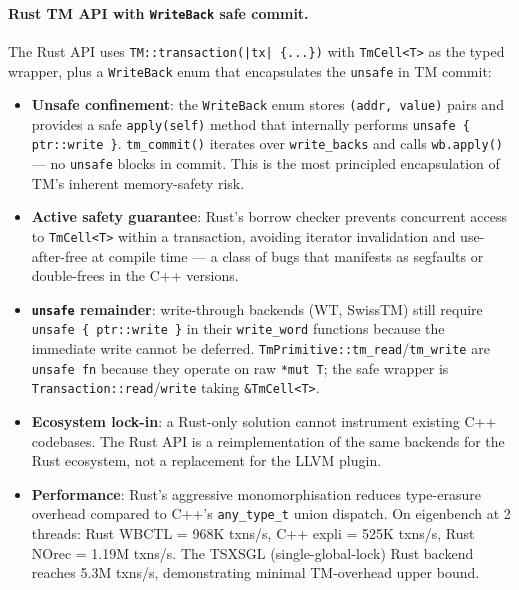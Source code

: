 \documentclass[article,12pt]{article}
\begin{document}
\paragraph{Rust TM API with \texttt{WriteBack} safe commit.}
The Rust API uses \texttt{TM::transaction(|tx| \{...\})} with
\texttt{TmCell<T>} as the typed wrapper, plus a \texttt{WriteBack} enum
that encapsulates the \texttt{unsafe} in TM commit:
\begin{itemize}
\item \textbf{Unsafe confinement}: the \texttt{WriteBack} enum stores
  \texttt{(addr, value)} pairs and provides a safe \texttt{apply(self)}
  method that internally performs \texttt{unsafe \{ ptr::write \}}.
  \texttt{tm\_commit()} iterates over \texttt{write\_backs} and calls
  \texttt{wb.apply()} --- no \texttt{unsafe} blocks in commit.  This is
  the most principled encapsulation of TM's inherent memory-safety risk.
\item \textbf{Active safety guarantee}: Rust's borrow checker prevents
  concurrent access to \texttt{TmCell<T>} within a transaction, avoiding
  iterator invalidation and use-after-free at compile time --- a class of
  bugs that manifests as segfaults or double-frees in the C++ versions.
\item \textbf{\texttt{unsafe} remainder}: write-through backends (WT,
  SwissTM) still require \texttt{unsafe \{ ptr::write \}} in their
  \texttt{write\_word} functions because the immediate write cannot be
  deferred.  \texttt{TmPrimitive::tm\_read}/\texttt{tm\_write} are
  \texttt{unsafe fn} because they operate on raw \texttt{*mut T}; the
  safe wrapper is \texttt{Transaction::read}/\texttt{write} taking
  \texttt{\&TmCell<T>}.
\item \textbf{Ecosystem lock-in}: a Rust-only solution cannot instrument
  existing C++ codebases.  The Rust API is a reimplementation of the same
  backends for the Rust ecosystem, not a replacement for the LLVM plugin.
\item \textbf{Performance}: Rust's aggressive monomorphisation reduces
  type-erasure overhead compared to C++'s \texttt{any\_type\_t} union
  dispatch.  On eigenbench at 2 threads:
  Rust WBCTL = 968K txns/s, C++ expli = 525K txns/s, Rust NOrec = 1.19M
  txns/s.  The TSXSGL (single-global-lock) Rust backend reaches 5.3M
  txns/s, demonstrating minimal TM-overhead upper bound.
\end{itemize}
\end{document}
